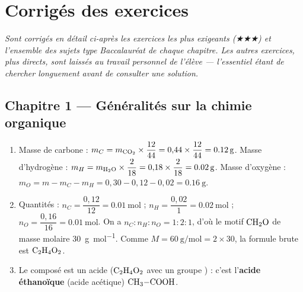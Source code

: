 \chapter{Corrigés des exercices}
\textit{Sont corrigés en détail ci-après les exercices les plus exigeants (★★★) et
l'ensemble des sujets type Baccalauréat de chaque chapitre. Les autres exercices,
plus directs, sont laissés au travail personnel de l'élève — l'essentiel étant de
chercher longuement avant de consulter une solution.}

\section{Chapitre 1 — Généralités sur la chimie organique}

\begin{enumerate}[label=\arabic*)]
\item Masse de carbone : $m_C = m_{\ce{CO2}}\times\dfrac{12}{44} = 0{,}44\times\dfrac{12}{44} = \SI{0.12}{\gram}$.
Masse d'hydrogène : $m_H = m_{\ce{H2O}}\times\dfrac{2}{18} = 0{,}18\times\dfrac{2}{18} = \SI{0.02}{\gram}$.
Masse d'oxygène : $m_O = m - m_C - m_H = 0{,}30 - 0{,}12 - 0{,}02 = \SI{0.16}{\gram}$.
\item Quantités : $n_C = \dfrac{0{,}12}{12} = \SI{0.01}{\mol}$ ; $n_H = \dfrac{0{,}02}{1} = \SI{0.02}{\mol}$ ;
$n_O = \dfrac{0{,}16}{16} = \SI{0.01}{\mol}$.
On a $n_C : n_H : n_O = 1 : 2 : 1$, d'où le motif $\ce{CH2O}$ de masse molaire \SI{30}{\gram\per\mol}.
Comme $M = \SI{60}{\gram\per\mol} = 2\times30$, la formule brute est $\ce{C2H4O2}$.
\item Le composé est un acide ($\ce{C2H4O2}$ avec un groupe ) : c'est
l'\textbf{acide éthanoïque} (acide acétique) $\ce{CH3-COOH}$.
\end{enumerate}

